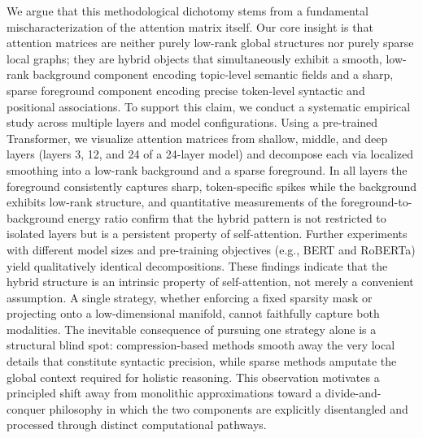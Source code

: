 \documentclass{article}
\begin{document}
We argue that this methodological dichotomy stems from a fundamental mischaracterization of the attention matrix itself. Our core insight is that attention matrices are neither purely low-rank global structures nor purely sparse local graphs; they are hybrid objects that simultaneously exhibit a smooth, low-rank background component encoding topic-level semantic fields and a sharp, sparse foreground component encoding precise token-level syntactic and positional associations. To support this claim, we conduct a systematic empirical study across multiple layers and model configurations. Using a pre-trained Transformer, we visualize attention matrices from shallow, middle, and deep layers (layers 3, 12, and 24 of a 24-layer model) and decompose each via localized smoothing into a low-rank background and a sparse foreground. In all layers the foreground consistently captures sharp, token-specific spikes while the background exhibits low-rank structure, and quantitative measurements of the foreground-to-background energy ratio confirm that the hybrid pattern is not restricted to isolated layers but is a persistent property of self-attention. Further experiments with different model sizes and pre-training objectives (e.g., BERT and RoBERTa) yield qualitatively identical decompositions. These findings indicate that the hybrid structure is an intrinsic property of self-attention, not merely a convenient assumption. A single strategy, whether enforcing a fixed sparsity mask or projecting onto a low-dimensional manifold, cannot faithfully capture both modalities. The inevitable consequence of pursuing one strategy alone is a structural blind spot: compression-based methods smooth away the very local details that constitute syntactic precision, while sparse methods amputate the global context required for holistic reasoning. This observation motivates a principled shift away from monolithic approximations toward a divide-and-conquer philosophy in which the two components are explicitly disentangled and processed through distinct computational pathways.
\end{document}
